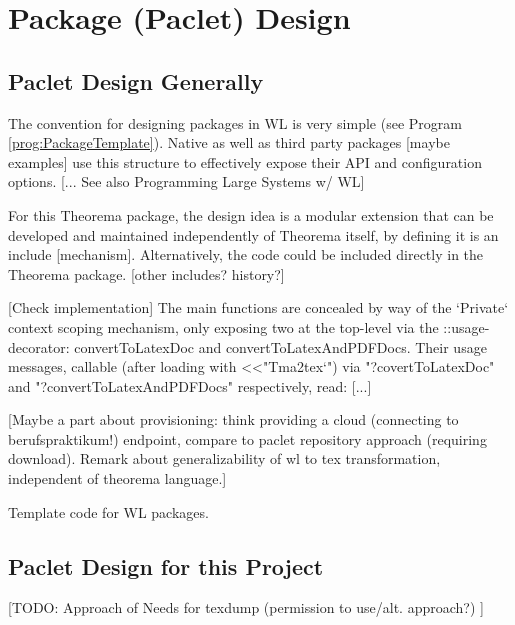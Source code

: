 \section{Package (Paclet) Design} \label{paclet-design}

\subsection{Paclet Design Generally}

The convention for designing packages in WL is very simple (see Program \ref{prog:PackageTemplate}). Native as well as third party packages [maybe examples] use this structure to effectively expose their API and configuration options. [... See also Programming Large Systems w/ WL]

For this Theorema package, the design idea is a modular extension that can be developed and maintained independently of Theorema itself, by defining it is an include [mechanism]. Alternatively, the code could be included directly in the Theorema package. [other includes? history?]

[Check implementation] The main functions are concealed by way of the `Private` context scoping mechanism, only exposing two at the top-level via the ::usage-decorator: convertToLatexDoc and convertToLatexAndPDFDocs. Their usage messages, callable (after loading with <<"Tma2tex`") via "?covertToLatexDoc" and "?convertToLatexAndPDFDocs" respectively, read: [...]

[Maybe a part about provisioning: think providing a cloud (connecting to berufspraktikum!) endpoint, compare to paclet repository approach (requiring download). Remark about generalizability of wl to tex transformation, independent of theorema language.]

\begin{program}
\caption{Template code for WL packages.}
\label{prog:PackageTemplate}
\end{program}

\subsection{Paclet Design for this Project}

[TODO: Approach of Needs for texdump (permission to use/alt. approach?) ]
